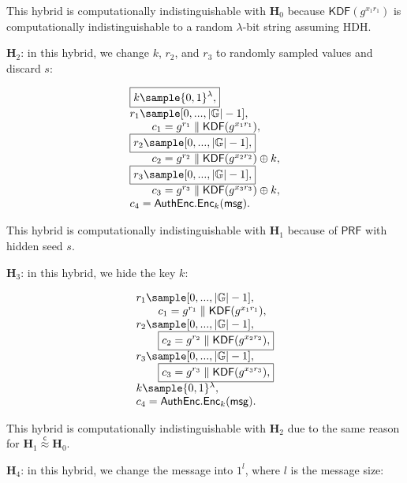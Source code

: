 \documentclass{article}
\begin{document}
This hybrid is computationally indistinguishable with $\mathbf{H}_0$ because $\mathsf{KDF}(g^{x_1r_1})$ is computationally indistinguishable to a random $\lambda$-bit string assuming HDH. 

\smallskip
\noindent $\mathbf{H}_2$: in this hybrid, we change $k$, $r_2$, and $r_3$ to randomly sampled values and discard $s$:

\[
\begin{array}{l}
\boxed{k\sample\{0,1\}^\lambda,}\\
r_1\sample[0,...,|\mathbb{G}|-1],\\
\qquad c_1=g^{r_1}\parallel\mathsf{KDF}(g^{x_1r_1}),\\
\boxed{r_2\sample[0,...,|\mathbb{G}|-1],}\\
\qquad c_2=g^{r_2}\parallel\mathsf{KDF}(g^{x_2r_2})\oplus k,\\
\boxed{r_3\sample[0,...,|\mathbb{G}|-1],}\\
\qquad c_3=g^{r_3}\parallel\mathsf{KDF}(g^{x_3r_3})\oplus k,\\
c_4=\mathsf{AuthEnc}.\mathsf{Enc}_k(\mathsf{msg}).
\end{array}
\]

This hybrid is computationally indistinguishable with $\mathbf{H}_1$ because of $\mathsf{PRF}$ with hidden seed $s$. 

\smallskip
\noindent $\mathbf{H}_3$: in this hybrid, we hide the key $k$:

\[
\begin{array}{l}
r_1\sample[0,...,|\mathbb{G}|-1],\\
\qquad c_1=g^{r_1}\parallel\mathsf{KDF}(g^{x_1r_1}),\\
r_2\sample[0,...,|\mathbb{G}|-1],\\
\qquad \boxed{c_2=g^{r_2}\parallel\mathsf{KDF}(g^{x_2r_2}),}\\
r_3\sample[0,...,|\mathbb{G}|-1],\\
\qquad \boxed{c_3=g^{r_3}\parallel\mathsf{KDF}(g^{x_3r_3}),}\\
k\sample\{0,1\}^\lambda,\\
c_4=\mathsf{AuthEnc}.\mathsf{Enc}_k(\mathsf{msg}).
\end{array}
\]

This hybrid is computationally indistinguishable with $\mathbf{H}_2$ due to the same reason for $\mathbf{H}_1\stackrel{\mathsf{c}}{\approx}\mathbf{H}_0$.

\smallskip
\noindent $\mathbf{H}_4$: in this hybrid, we change the message into $1^l$, where $l$ is the message size:
\end{document}
